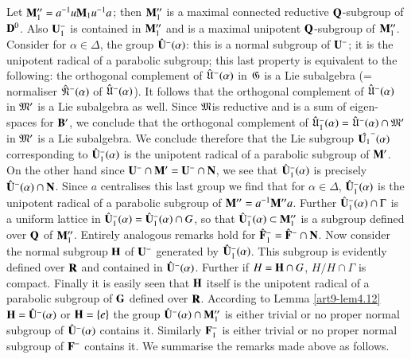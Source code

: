 \setcounter{subsection}{20}
\subsection{}\label{art9-subsec4.21}
Let $\mathbf{M}''_1 = a^{-1} u \mathbf{M}_1 u^{-1} a$; then $\mathbf{M}''_1$ is a maximal connected reductive $\mathbf{Q}$-subgroup of $\mathbf{D}^0$. Also $\mathbf{U}^-_1$ is contained in $\mathbf{M}''_1$ and is a maximal unipotent $\mathbf{Q}$-subgroup of $\mathbf{M}''_1$. Consider for $\alpha \in \Delta$, the group $\hat{\mathbf{U}}^-(\alpha)$: this is a normal subgroup of $\mathbf{U}^-$; it is the unipotent radical of a parabolic subgroup; this last property is equivalent to the following: the orthogonal complement of $\hat{\mathfrak{U}}^-(\alpha)$ in $\mathfrak{G}$ is a Lie subalgebra (= normaliser $\hat{\mathfrak{N}}^-(\alpha)$ of $\hat{\mathfrak{U}}^- (\alpha)$). It follows that the orthogonal complement of $\hat{\mathfrak{U}}^-(\alpha)$ in $\mathfrak{M}'$ is a Lie subalgebra as well. Since $\mathfrak{M}$\pageoriginale is reductive and is a sum of eigen-spaces for $\mathbf{B}'$, we conclude that the orthogonal complement of $\hat{\mathfrak{U}}^-_1 (\alpha) = \hat{\mathfrak{U}}^-(\alpha) \cap \mathfrak{M}'$ in $\mathfrak{M}'$ is a Lie subalgebra. We conclude therefore that the Lie subgroup $\hat{\mathbf{U}_1}^-(\alpha)$ corresponding to $\hat{\mathbf{U}}^-_1 (\alpha)$ is the unipotent radical of a parabolic subgroup of $\mathbf{M}'$. On the other hand since $\mathbf{U}^- \cap \mathbf{M}' = \mathbf{U}^- \cap \mathbf{N}$, we see that $\hat{\mathbf{U}}^-_1 (\alpha)$ is precisely $\hat{\mathbf{U}}^-(\alpha) \cap \mathbf{N}$. Since $a$ centralises this last group we find that for $\alpha \in\Delta$, $\hat{\mathbf{U}}^-_1 (\alpha)$ is the unipotent radical of a parabolic subgroup of $\mathbf{M}'' = a^{-1} \mathbf{M}'' a$. Further $\hat{\mathbf{U}}^-_1 (\alpha) \cap \Gamma$ is a uniform lattice in $\hat{\mathbf{U}}^-_1 (\alpha) = \hat{\mathbf{U}}^-_1 (\alpha ) \cap G$, so that $\hat{\mathbf{U}}^-_1 (\alpha) \subset \mathbf{M}''_1$ is a subgroup defined over $\mathbf{Q}$ of $\mathbf{M}''_1$. Entirely analogous remarks hold for $\hat{\mathbf{F}}^-_1 = \hat{\mathbf{F}}^- \cap \mathbf{N}$. Now consider the normal subgroup $\mathbf{H}$ of $\mathbf{U}^-$ generated by $\hat{\mathbf{U}}^-_1 (\alpha)$. This subgroup is evidently defined over $\mathbf{R}$ and contained in $\hat{\mathbf{U}}^-(\alpha)$. Further if $H = \mathbf{H} \cap G$,  $H/ H\cap \Gamma$ is compact. Finally it is easily seen that $\mathbf{H}$ itself is the unipotent radical of a  parabolic subgroup of $\mathbf{G}$ defined over $\mathbf{R}$. According to Lemma \ref{art9-lem4.12} $\mathbf{H} = \hat{\mathbf{U}}^-(\alpha)$ or $\mathbf{H} = \{e\}$ \ie the group $\hat{\mathbf{U}}^-(\alpha) \cap \mathbf{M}''_1$ is either trivial or no proper normal subgroup of $\hat{\mathbf{U}}^-(\alpha)$ contains it. Similarly $\mathbf{F}^-_1$ is either trivial or no proper normal subgroup of $\mathbf{F}^-$ contains it. We summarise the remarks made above as follows.

